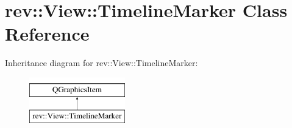 \hypertarget{classrev_1_1_view_1_1_timeline_marker}{}\section{rev\+::View\+::Timeline\+Marker Class Reference}
\label{classrev_1_1_view_1_1_timeline_marker}
Inheritance diagram for rev\+::View\+::Timeline\+Marker\+:\begin{figure}[H]
\begin{center}
\leavevmode
\includegraphics[height=2.000000cm]{classrev_1_1_view_1_1_timeline_marker}
\end{center}
\end{figure}
